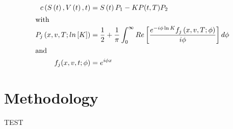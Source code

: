\documentclass[12pt]{report}
\newcommand{\St}{S\left(t\right)}
\newcommand{\Vt}{V\left(t\right)}
\begin{document}
\begin{align}
  c\left(\St, \Vt, t\right) & = \St P_1 - K P(t, T)P_2 \\ \intertext{with}
  P_j\left(x, v, T; ln\left[K\right]\right) & = \frac{1}{2} + \frac{1}{\pi} \int_{0}^{\infty} Re \left[ \frac{e^{-i \phi \ln{K}} f_j \left( x, v, T; \phi \right)}{i \phi} \right] d\phi \\ \intertext{and}
  f_j(x, v, t; \phi) & = e^{i \phi x}
\end{align}
%
%
\chapter{Methodology}
\label{cha:Methodology}

TEST







\end{document}
